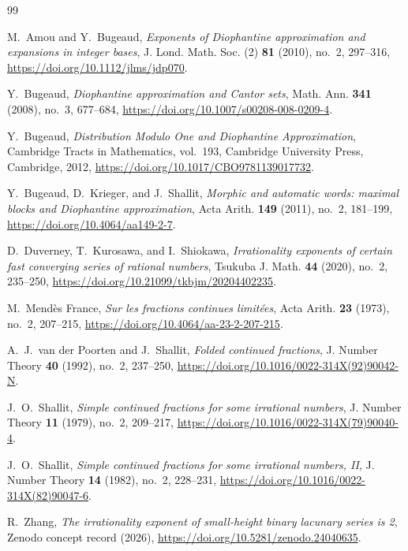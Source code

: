 \documentclass{amsart}
\numberwithin{equation}{section}
\begin{document}
\begin{thebibliography}{99}

M.~Amou and Y.~Bugeaud, \emph{Exponents of Diophantine approximation
and expansions in integer bases}, J. Lond. Math. Soc. (2)
\textbf{81} (2010), no.~2, 297--316,
\url{https://doi.org/10.1112/jlms/jdp070}.

Y.~Bugeaud, \emph{Diophantine approximation and Cantor sets},
Math. Ann. \textbf{341} (2008), no.~3, 677--684,
\url{https://doi.org/10.1007/s00208-008-0209-4}.

Y.~Bugeaud, \emph{Distribution Modulo One and Diophantine Approximation},
Cambridge Tracts in Mathematics, vol.~193, Cambridge University Press,
Cambridge, 2012, \url{https://doi.org/10.1017/CBO9781139017732}.

Y.~Bugeaud, D.~Krieger, and J.~Shallit,
\emph{Morphic and automatic words: maximal blocks and Diophantine
approximation}, Acta Arith. \textbf{149} (2011), no.~2, 181--199,
\url{https://doi.org/10.4064/aa149-2-7}.

D.~Duverney, T.~Kurosawa, and I.~Shiokawa,
\emph{Irrationality exponents of certain fast converging series of
rational numbers}, Tsukuba J. Math. \textbf{44} (2020), no.~2,
235--250, \url{https://doi.org/10.21099/tkbjm/20204402235}.

M.~Mend\`es France, \emph{Sur les fractions continues limit\'ees},
Acta Arith. \textbf{23} (1973), no.~2, 207--215,
\url{https://doi.org/10.4064/aa-23-2-207-215}.

A.~J.~van der Poorten and J.~Shallit, \emph{Folded continued fractions},
J. Number Theory \textbf{40} (1992), no.~2, 237--250,
\url{https://doi.org/10.1016/0022-314X(92)90042-N}.

J.~O.~Shallit, \emph{Simple continued fractions for some irrational
numbers}, J. Number Theory \textbf{11} (1979), no.~2, 209--217,
\url{https://doi.org/10.1016/0022-314X(79)90040-4}.

J.~O.~Shallit, \emph{Simple continued fractions for some irrational
numbers, II}, J. Number Theory \textbf{14} (1982), no.~2, 228--231,
\url{https://doi.org/10.1016/0022-314X(82)90047-6}.

R.~Zhang, \emph{The irrationality exponent of small-height binary
lacunary series is 2}, Zenodo concept record (2026),
\url{https://doi.org/10.5281/zenodo.24040635}.

\end{thebibliography}
\end{document}
